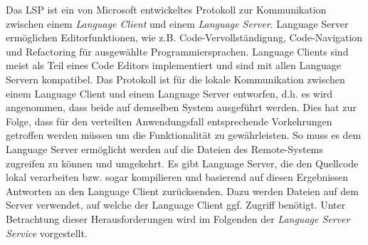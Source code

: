 Das \acl{LSP} ist ein von Microsoft \cite{noauthor_microsoft_nodate} entwickeltes Protokoll zur Kommunikation zwischen einem \textit{Language Client} und einem \textit{Language Server}. Language Server ermöglichen Editorfunktionen, wie z.B. Code-Vervollständigung, Code-Navigation und Refactoring für ausgewählte Programmiersprachen. Language Clients sind meist als Teil eines Code Editors implementiert und sind mit allen Language Servern kompatibel. Das Protokoll ist für die lokale Kommunikation zwischen einem Language Client und einem Language Server entworfen, d.h. es wird angenommen, dass beide auf demselben System ausgeführt werden. Dies hat zur Folge, dass für den verteilten Anwendungsfall entsprechende Vorkehrungen getroffen werden müssen um die Funktionalität zu gewährleisten. So muss es dem Language Server ermöglicht werden auf die Dateien des Remote-Systems zugreifen zu können und umgekehrt. Es gibt Language Server, die den Quellcode lokal verarbeiten bzw. sogar kompilieren und basierend auf diesen Ergebnissen Antworten an den Language Client zurücksenden. Dazu werden Dateien auf dem Server verwendet, auf welche der Language Client ggf. Zugriff benötigt. Unter Betrachtung dieser Herausforderungen wird im Folgenden der \textit{Language Server Service} vorgestellt.

